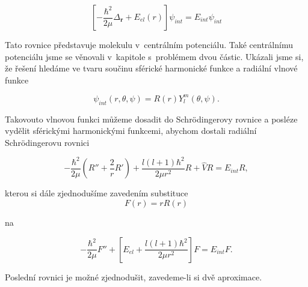 \begin{equation}
\left[-\frac{\hbar^2}{2\mu}\Delta_{\textbf{r}}+E_{el}(r)\right]\psi_{int}=E_{int}\psi_{int}
\label{vibrot:vibrot2}
\end{equation}


Tato rovnice představuje molekulu v~centrálním potenciálu. Také centrálnímu potenciálu jsme se věnovali v~kapitole s~problémem dvou částic. Ukázali jsme si, že řešení hledáme ve tvaru součinu sférické harmonické funkce a radiální vlnové funkce

\begin{equation}
\psi_{int}(r,\theta,\psi)=R(r)Y^m_l(\theta,\psi).
\end{equation}

\noindent Takovouto vlnovou funkci můžeme dosadit do Schr\"odingerovy rovnice a posléze vydělit sférickými harmonickými funkcemi, abychom dostali radiální Schr\"odingerovu rovnici

\begin{equation}
-\frac{\hbar^2}{2\mu}\left(R''+\frac{2}{r}R'\right)+\frac{l\left(l+1\right)\hbar^2}{2\mu r^2}R+\hat{V}R=E_{int}R,
\end{equation}

\noindent kterou si dále zjednodušíme zavedením substituce
\begin{displaymath}
F(r)=rR(r)
\end{displaymath}

\noindent na

\begin{equation}
-\frac{\hbar^2}{2\mu}F''+\left[E_{el}+\frac{l\left(l+1\right)\hbar^2}{2\mu r^2}\right]F=E_{int}F.
\label{vibrot:vibrot3}
\end{equation}

\noindent Poslední rovnici je možné zjednodušit, zavedeme-li si dvě aproximace. 

